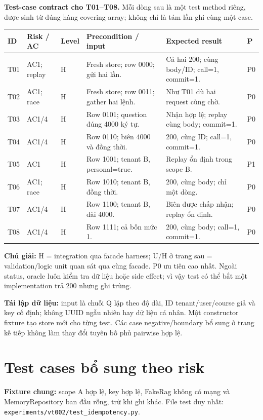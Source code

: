 \documentclass[11pt,a4paper]{article}
\DeclareRobustCommand{\code}[1]{\nolinkurl{#1}}
\begin{document}
\textbf{Test-case contract cho T01--T08.} Mỗi dòng sau là một test method riêng, được sinh từ đúng hàng covering array; không chỉ là tám lần ghi cùng một case.
\begin{tabular}{@{}L{9mm}L{16mm}L{14mm}L{47mm}L{59mm}L{10mm}@{}}
\toprule
\textbf{ID} & \textbf{Risk / AC} & \textbf{Level} & \textbf{Precondition / input} & \textbf{Expected result} & \textbf{P}\\\midrule
T01 & AC1; replay & H & Fresh store; row 0000; gửi hai lần. & Cả hai 200; cùng body/ID; call=1, commit=1. & P0\\[3pt]
T02 & AC1; race & H & Fresh store; row 0011; gather hai lệnh. & Như T01 dù hai request cùng chờ. & P0\\[3pt]
T03 & AC1/4 & H & Row 0101; question đúng 4000 ký tự. & Nhận hợp lệ; replay cùng body; commit=1. & P0\\[3pt]
T04 & AC1/4 & H & Row 0110; biên 4000 và đồng thời. & 200, cùng ID; call=1, commit=1. & P0\\[3pt]
T05 & AC1 & H & Row 1001; tenant B, personal=true. & Replay ổn định trong scope B. & P1\\[3pt]
T06 & AC1; race & H & Row 1010; tenant B, đồng thời. & 200, cùng body; chỉ một dòng. & P0\\[3pt]
T07 & AC1/4 & H & Row 1100; tenant B, dài 4000. & Biên được chấp nhận; replay ổn định. & P0\\[3pt]
T08 & AC1/4 & H & Row 1111; cả bốn mức 1. & 200, cùng body; call=1, commit=1. & P0\\
\bottomrule
\end{tabular}

\textbf{Chú giải:} H = integration qua facade harness; U/H ở trang sau = validation/logic unit quan sát qua cùng facade. P0 ưu tiên cao nhất. Ngoài status, oracle luôn kiểm tra dữ liệu hoặc side effect; vì vậy test có thể bắt một implementation trả 200 nhưng ghi trùng.

\textbf{Tái lập dữ liệu:} input là chuỗi Q lặp theo độ dài, ID tenant/user/course giả và key cố định; không UUID ngẫu nhiên hay dữ liệu cá nhân. Một constructor fixture tạo store mới cho từng test. Các case negative/boundary bổ sung ở trang kế tiếp không làm thay đổi tuyên bố phủ pairwise hợp lệ.

\newpage
\section{Test cases bổ sung theo risk}
\textbf{Fixture chung:} scope A hợp lệ, key hợp lệ, FakeRag không có mạng và MemoryRepository ban đầu rỗng, trừ khi ghi khác. File test duy nhất: \code{experiments/vt002/test_idempotency.py}.
\end{document}
